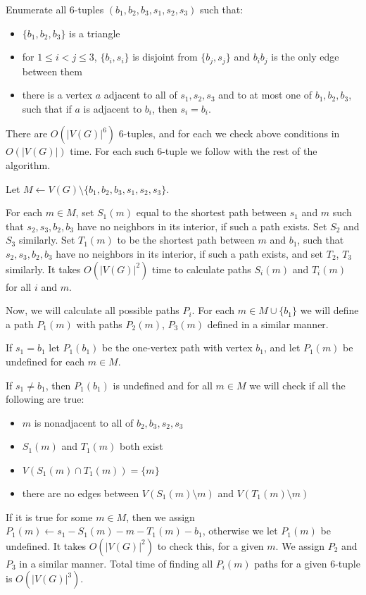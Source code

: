\begin{algtext2}

	Enumerate all 6-tuples $(b_1, b_2, b_3, s_1, s_2, s_3)$ such that:
	\begin{itemize}
		\item $\{b_1, b_2, b_3\}$ is a triangle
		\item for $1 \leq i < j \leq 3$, $\{b_i, s_i\}$ is disjoint from $\{b_j, s_j\}$ and $b_ib_j$ is the only edge between them
		\item there is a vertex $a$ adjacent to all of $s_1, s_2, s_3$ and to at most one of $b_1, b_2, b_3$, such that if $a$ is adjacent to $b_i$, then $s_i = b_i$.
	\end{itemize}

	There are $O(|V(G)|^6)$ 6-tuples, and for each we check above conditions in $O(|V(G)|)$ time. For each such 6-tuple we follow with the rest of the algorithm.

	Let $M \leftarrow V(G) \setminus \{b_1, b_2, b_3, s_1, s_2, s_3\}$.

	For each $m \in M$, set $S_1(m)$ equal to the shortest path between $s_1$ and $m$ such that $s_2, s_3, b_2, b_3$ have no neighbors in its interior, if such a path exists. Set $S_2$ and $S_3$ similarly. Set $T_1(m)$ to be the shortest path between $m$ and $b_1$, such that $s_2, s_3, b_2, b_3$ have no neighbors in its interior, if such a path exists, and set $T_2$, $T_3$ similarly. It takes $O(|V(G)|^2)$ time to calculate paths $S_i(m)$ and $T_i(m)$ for all $i$ and $m$.

	Now, we will calculate all possible paths $P_i$. For each $m \in M \cup \{b_1\}$ we will define a path $P_1(m)$ with paths $P_2(m)$, $P_3(m)$ defined in a similar manner.

	If $s_1 = b_1$ let $P_1(b_1)$ be the one-vertex path with vertex $b_1$, and let $P_1(m)$ be undefined for each $m \in M$.

	If $s_1 \neq b_1$, then $P_1(b_1)$ is undefined and for all $m \in M$ we will check if all the following are true:
	\begin{itemize}
		\item $m$ is nonadjacent to all of $b_2, b_3, s_2, s_3$
		\item $S_1(m)$ and $T_1(m)$ both exist
		\item $V(S_1(m) \cap T_1(m)) = \{m\}$
		\item there are no edges between $V(S_1(m) \setminus m)$ and $V(T_1(m) \setminus m)$
	\end{itemize}
	If it is true for some $m \in M$, then we assign $P_1(m) \leftarrow s_1-S_1(m)-m-T_1(m)-b_1$, otherwise we let $P_1(m)$ be undefined. It takes $O(|V(G)|^2)$ to check this, for a given $m$. We assign $P_2$ and $P_3$ in a similar manner. Total time of finding all $P_i(m)$ paths for a given 6-tuple is $O(|V(G)|^3)$.


\end{algtext2}

